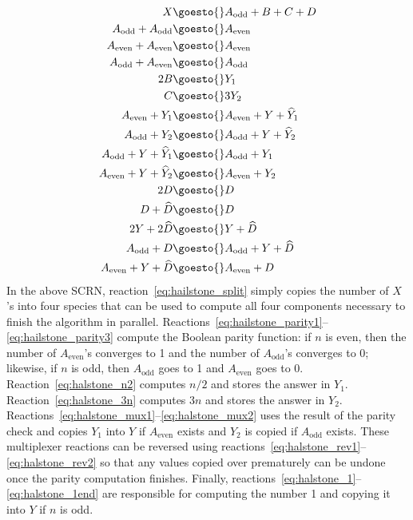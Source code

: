 \begin{align}
    X &\goesto{} A_\text{odd} + B + C + D\label{eq:hailstone_split}\\
    A_\text{odd} + A_\text{odd} &\goesto{} A_\text{even}\label{eq:hailstone_parity1}\\
    A_\text{even} + A_\text{even} &\goesto{} A_\text{even}\label{eq:hailstone_parity2}\\
    A_\text{odd} + A_\text{even} &\goesto{} A_\text{odd}\label{eq:hailstone_parity3}\\
    2 B &\goesto{} Y_1\label{eq:halstone_n2}\\
    C &\goesto{} 3Y_2\label{eq:halstone_3n}\\
    A_\text{even} + Y_1 &\goesto{} A_\text{even} + Y + \widehat{Y}_1\label{eq:halstone_mux1}\\
    A_\text{odd} + Y_2 &\goesto{} A_\text{odd} + Y + \widehat{Y}_2\label{eq:halstone_mux2}\\
    A_\text{odd} + Y + \widehat{Y}_1 &\goesto{} A_\text{odd} + Y_1\label{eq:halstone_rev1}\\
    A_\text{even} + Y + \widehat{Y}_2 &\goesto{} A_\text{even} + Y_2\label{eq:halstone_rev2}\\
    2 D &\goesto{} D\label{eq:halstone_1}\\
    D + \widehat{D} &\goesto{} D\\
    2Y + 2\widehat{D} &\goesto{} Y + \widehat{D}\\
    A_\text{odd} + D &\goesto{} A_\text{odd} + Y + \widehat{D}\\
    A_\text{even} + Y + \widehat{D} &\goesto{} A_\text{even} + D\label{eq:halstone_1end}
\end{align}
In the above SCRN, reaction~\eqref{eq:hailstone_split} simply copies the number of \( X \)'s into four species that can be used to compute all four components necessary to finish the algorithm in parallel.
Reactions~\eqref{eq:hailstone_parity1}--\eqref{eq:hailstone_parity3} compute the Boolean parity function: if \( n \) is even, then the number of \( A_\text{even} \)'s converges to 1 and the number of \( A_\text{odd} \)'s converges to 0; likewise, if \( n \) is odd, then \( A_\text{odd} \) goes to 1 and \( A_\text{even} \) goes to 0.
Reaction~\eqref{eq:halstone_n2} computes \( n/2 \) and stores the answer in \( Y_1 \).
Reaction~\eqref{eq:halstone_3n} computes \( 3n \) and stores the answer in \( Y_2 \).
Reactions~\eqref{eq:halstone_mux1}--\eqref{eq:halstone_mux2} uses the result of the parity check and copies \( Y_1 \) into \( Y \) if \( A_\text{even} \) exists and \( Y_2 \) is copied if \( A_\text{odd} \) exists.
These multiplexer reactions can be reversed using reactions~\eqref{eq:halstone_rev1}--\eqref{eq:halstone_rev2} so that any values copied over prematurely can be undone once the parity computation finishes.
Finally, reactions~\eqref{eq:halstone_1}--\eqref{eq:halstone_1end} are responsible for computing the number 1 and copying it into \( Y \) if \( n \) is odd.

